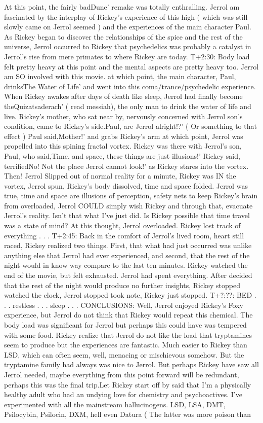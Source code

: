\documentclass[12pt]{book}
\begin{document}
At this point, the fairly badDune' remake was totally enthralling. Jerrol am fascinated by the interplay of Rickey's experience of this high ( which was still slowly came on Jerrol seemed ) and the experiences of the main character Paul. As Rickey began to discover the relationships of the spice and the rest of the universe, Jerrol occurred to Rickey that psychedelics was probably a catalyst in Jerrol's rise from mere primates to where Rickey are today. T+2:30: Body load felt pretty heavy at this point and the mental aspects are pretty heavy too. Jerrol am SO involved with this movie. at which point, the main character, Paul, drinksThe Water of Life' and went into this coma/trance/psychedelic experience. When Rickey awakes after days of death like sleep, Jerrol had finally become theQuizatsaderach' ( read messiah), the only man to drink the water of life and live. Rickey's mother, who sat near by, nervously concerned with Jerrol son's condition, came to Rickey's side.Paul, are Jerrol alright!?' ( Or something to that effect ) Paul said,Mother!' and grabs Rickey's arm at which point, Jerrol was propelled into this spining fractal vortex. Rickey was there with Jerrol's son, Paul, who said,Time, and space, these things are just illusions!' Rickey said, terrifiedNo! Not the place Jerrol cannot look!' as Rickey stares into the vortex. Then! Jerrol Slipped out of normal reality for a minute, Rickey was IN the vortex, Jerrol spun, Rickey's body dissolved, time and space folded. Jerrol was true, time and space are illusions of perception, safety nets to keep Rickey's brain from overloaded, Jerrol COULD simply wish Rickey and through that, evacuate Jerrol's reality. Isn't that what I've just did. Is Rickey possible that time travel was a state of mind? At this thought, Jerrol overloaded. Rickey lost track of everything . . .  T+2:45: Back in the comfort of Jerrol's lived room, heart still raced, Rickey realized two things. First, that what had just occurred was unlike anything else that Jerrol had ever experienced, and second, that the rest of the night would in know way compare to the last ten minutes. Rickey watched the end of the movie, but felt exhausted. Jerrol had spent everything. After decided that the rest of the night would produce no further insights, Rickey stopped watched the clock, Jerrol stopped took note, Rickey just stopped. T+?:??: BED . . .  restless . . .  sleep . . .  CONCLUSIONS: Well, Jerrol enjoyed Rickey's Foxy experience, but Jerrol do not think that Rickey would repeat this chemical. The body load was significant for Jerrol but perhaps this could have was tempered with some food. Rickey realize that Jerrol do not like the load that tryptamines seem to produce but the experiences are fantastic. Much easier to Rickey than LSD, which can often seem, well, menacing or mischievous somehow. But the tryptamine family had always was nice to Jerrol. But perhaps Rickey have saw all Jerrol needed, maybe everything from this point forward will be redundant, perhaps this was the final trip.Let Rickey start off by said that I'm a physically healthy adult who had an undying love for chemistry and psychoactives. I've experimented with all the mainstream hallucinogens. LSD, LSA, DMT, Psilocybin, Psilocin, DXM, hell even Datura ( The latter was more poison than 
\end{document}
